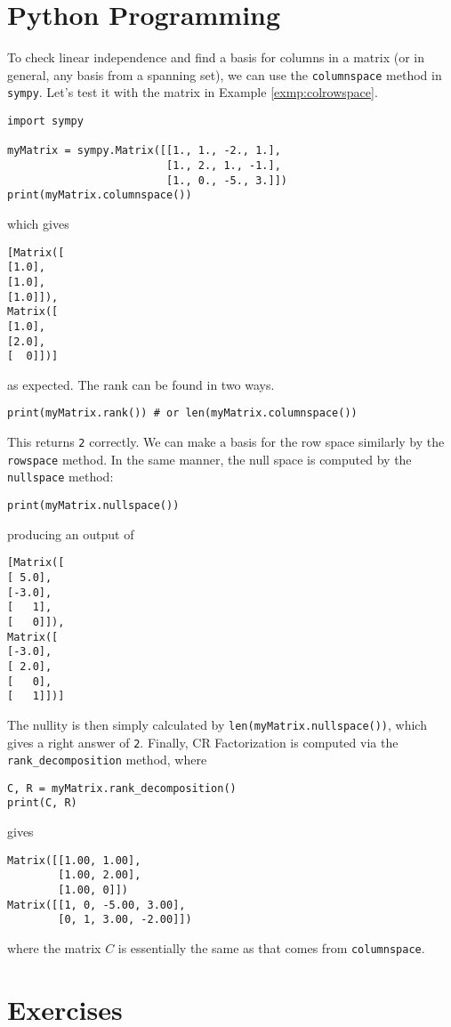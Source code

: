 \section{Python Programming}
To check linear independence and find a basis for columns in a matrix (or in general, any basis from a spanning set), we can use the \verb|columnspace| method in \verb|sympy|. Let's test it with the matrix in Example \ref{exmp:colrowspace}.
\begin{lstlisting}
import sympy

myMatrix = sympy.Matrix([[1., 1., -2., 1.],
                         [1., 2., 1., -1.],
                         [1., 0., -5., 3.]])
print(myMatrix.columnspace())
\end{lstlisting}
which gives
\begin{lstlisting}
[Matrix([        
[1.0],
[1.0],
[1.0]]), 
Matrix([
[1.0],
[2.0],
[  0]])]   
\end{lstlisting}
as expected. The rank can be found in two ways.
\begin{lstlisting}
print(myMatrix.rank()) # or len(myMatrix.columnspace())
\end{lstlisting}
This returns \verb|2| correctly. We can make a basis for the row space similarly by the \verb|rowspace| method. In the same manner, the null space is computed by the \verb|nullspace| method:
\begin{lstlisting}
print(myMatrix.nullspace())
\end{lstlisting}
producing an output of
\begin{lstlisting}
[Matrix([
[ 5.0],
[-3.0],
[   1],
[   0]]), 
Matrix([
[-3.0],
[ 2.0],
[   0],
[   1]])]
\end{lstlisting}
The nullity is then simply calculated by \verb|len(myMatrix.nullspace())|, which gives a right answer of \verb|2|. Finally, CR Factorization is computed via the \verb|rank_decomposition| method, where
\begin{lstlisting}
C, R = myMatrix.rank_decomposition()
print(C, R)    
\end{lstlisting}
gives
\begin{lstlisting}
Matrix([[1.00, 1.00], 
        [1.00, 2.00], 
        [1.00, 0]])
Matrix([[1, 0, -5.00, 3.00], 
        [0, 1, 3.00, -2.00]])        
\end{lstlisting}
where the matrix $C$ is essentially the same as that comes from \verb|columnspace|.

\section{Exercises}

